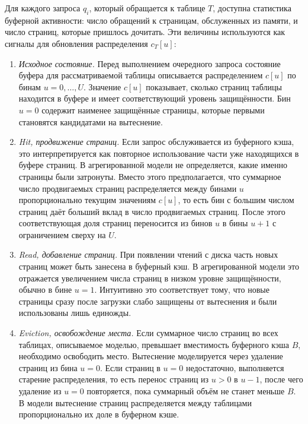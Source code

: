 Для каждого запроса $q_i$, который обращается к таблице $T$, доступна статистика буферной активности: число обращений к страницам, обслуженных из памяти, и число страниц, которые пришлось дочитать. Эти величины используются как сигналы для обновления распределения $c_T[u]$:
\begin{enumerate}
  \item \textit{Исходное состояние.} Перед выполнением очередного запроса состояние буфера для рассматриваемой таблицы описывается распределением $c[u]$ по бинам $u=0,\ldots,U$. Значение $c[u]$ показывает, сколько страниц таблицы находится в буфере и имеет соответствующий уровень защищённости. Бин $u=0$ содержит наименее защищённые страницы, которые первыми становятся кандидатами на вытеснение.

  \item \textit{Hit, продвижение страниц.} Если запрос обслуживается из буферного кэша, это интерпретируется как повторное использование части уже находящихся в буфере страниц. В агрегированной модели не определяется, какие именно страницы были затронуты. Вместо этого предполагается, что суммарное число продвигаемых страниц распределяется между бинами \(u\) пропорционально текущим значениям \(c[u]\), то есть бин с большим числом страниц даёт больший вклад в число продвигаемых страниц. После этого соответствующая доля страниц переносится из бинов \(u\) в бины \(u+1\) с ограничением сверху на \(U\).

  \item \textit{Read, добавление страниц.} При появлении чтений с диска часть новых страниц может быть занесена в буферный кэш. В агрегированной модели это отражается увеличением числа страниц в низком уровне защищённости, обычно в бине $u=1$. Интуитивно это соответствует тому, что новые страницы сразу после загрузки слабо защищены от вытеснения и были использованы лишь единожды.

  \item \textit{Eviction, освобождение места.} Если суммарное число страниц во всех таблицах, описываемое моделью, превышает вместимость буферного кэша $B$, необходимо освободить место. Вытеснение моделируется через удаление страниц из бина $u=0$. Если страниц в $u=0$ недостаточно, выполняется старение распределения, то есть перенос страниц из $u>0$ в $u-1$, после чего удаление из $u=0$ повторяется, пока суммарный объём не станет меньше $B$. В модели вытеснение страниц распределяется между таблицами пропорционально их доле в буферном кэше.
\end{enumerate}

